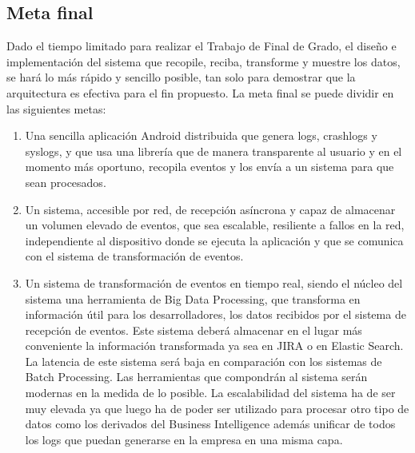\subsection{Meta final}
Dado el tiempo limitado para realizar el Trabajo de Final de Grado, el diseño e implementación del sistema que recopile, reciba, transforme y muestre los datos, se hará lo más rápido y sencillo posible, tan solo para demostrar que la arquitectura es efectiva para el fin propuesto. La meta final se puede dividir en las siguientes metas:

\begin{enumerate}
	
	\item Una sencilla aplicación Android distribuida que genera logs, crashlogs y syslogs, y que usa una librería que de manera transparente al usuario y en el momento más oportuno, recopila eventos y los envía a un sistema para que sean procesados. 
	
	\item Un sistema, accesible por red, de recepción asíncrona y capaz de almacenar un volumen elevado de eventos, que sea escalable, resiliente a fallos en la red, independiente al dispositivo donde se ejecuta la aplicación y que se comunica con el sistema de transformación de eventos.
	
	\item Un sistema de transformación de eventos en tiempo real, siendo el núcleo del sistema una herramienta de Big Data Processing, que transforma en información útil para los desarrolladores, los datos recibidos por el sistema de recepción de eventos. Este sistema deberá almacenar en el lugar más conveniente la información transformada ya sea en JIRA o en Elastic Search. La latencia de este sistema será baja en comparación con los sistemas de Batch Processing. Las herramientas que compondrán al sistema serán modernas en la medida de lo posible. La escalabilidad del sistema ha de ser muy elevada ya que luego ha de poder ser utilizado para procesar otro tipo de datos como los derivados del Business Intelligence además unificar de todos los logs que puedan generarse en la empresa en una misma capa.
	
\end{enumerate}






